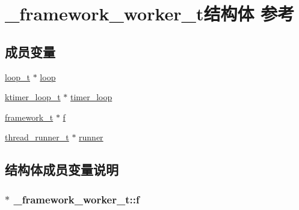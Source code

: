 \hypertarget{a00014}{}\section{\+\_\+framework\+\_\+worker\+\_\+t结构体 参考}
\label{a00014}
\subsection*{成员变量}
\begin{DoxyCompactItemize}
\item 
\hyperlink{a00051_a9c3ad1cd2de83e09f3a7b59fa82c94ee_a9c3ad1cd2de83e09f3a7b59fa82c94ee}{loop\+\_\+t} $\ast$ \hyperlink{a00014_ab4522a69094d41136b14e382ef3fcb8a_ab4522a69094d41136b14e382ef3fcb8a}{loop}
\item 
\hyperlink{a00051_a024af2aa29615e7a811ea6c45438157d_a024af2aa29615e7a811ea6c45438157d}{ktimer\+\_\+loop\+\_\+t} $\ast$ \hyperlink{a00014_aebe8f77f194db6f97b64a465f000d628_aebe8f77f194db6f97b64a465f000d628}{timer\+\_\+loop}
\item 
\hyperlink{a00051_a6149d769f6f07ed14a40a271c95d8463_a6149d769f6f07ed14a40a271c95d8463}{framework\+\_\+t} $\ast$ \hyperlink{a00014_a807e1f788cb43947cfe5c14c95b8cd22_a807e1f788cb43947cfe5c14c95b8cd22}{f}
\item 
\hyperlink{a00051_a9054159cde2f926ef61c28ce1e555199_a9054159cde2f926ef61c28ce1e555199}{thread\+\_\+runner\+\_\+t} $\ast$ \hyperlink{a00014_a815b2ce0f2ea29ae265bb7dc2e804165_a815b2ce0f2ea29ae265bb7dc2e804165}{runner}
\end{DoxyCompactItemize}


\subsection{结构体成员变量说明}
\hypertarget{a00014_a807e1f788cb43947cfe5c14c95b8cd22_a807e1f788cb43947cfe5c14c95b8cd22}{}
\subsubsection[{f}]{$\ast$ \+\_\+framework\+\_\+worker\+\_\+t\+::f}\label{a00014_a807e1f788cb43947cfe5c14c95b8cd22_a807e1f788cb43947cfe5c14c95b8cd22}
\hypertarget{a00014_ab4522a69094d41136b14e382ef3fcb8a_ab4522a69094d41136b14e382ef3fcb8a}{}
